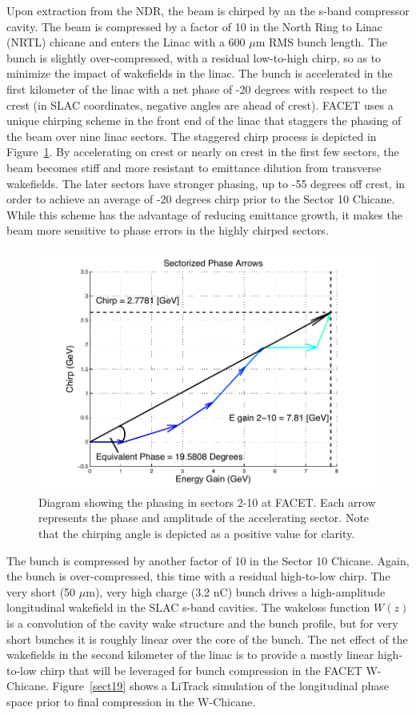\documentclass[%
twocolumn,
showpacs,preprintnumbers,
 aps,
prstab,
]{revtex4-1}
\begin{document}
Upon extraction from the NDR, the beam is chirped by an the s-band compressor cavity. The beam is compressed by a factor of 10 in the North Ring to Linac (NRTL) chicane and enters the Linac with a 600 $\mu$m RMS bunch length. The bunch is slightly over-compressed, with a residual low-to-high chirp, so as to minimize the impact of wakefields in the linac. The bunch is accelerated in the first kilometer of the linac with a net phase of -20 degrees with respect to the crest (in SLAC coordinates, negative angles are ahead of crest). FACET uses a unique chirping scheme in the front end of the linac that staggers the phasing of the beam over nine linac sectors. The staggered chirp process is depicted in Figure~\ref{stag}. By accelerating on crest or nearly on crest in the first few sectors, the beam becomes stiff and more resistant to emittance dilution from transverse wakefields. The later sectors have stronger phasing, up to -55 degrees off crest, in order to achieve an average of -20 degrees chirp prior to the Sector 10 Chicane. While this scheme has the advantage of reducing emittance growth, it makes the beam more sensitive to phase errors in the highly chirped sectors.

\begin{figure}[hb]
  \includegraphics[width=\columnwidth]{figures/stag.pdf}
  \caption{Diagram showing the phasing in sectors 2-10 at FACET. Each arrow represents the phase and amplitude of the accelerating sector. Note that the chirping angle is depicted as a positive value for clarity.}
  \label{stag}
\end{figure}

The bunch is compressed by another factor of 10 in the Sector 10 Chicane. Again, the bunch is over-compressed, this time with a residual high-to-low chirp. The very short (50 $\mu$m), very high charge (3.2 nC) bunch drives a high-amplitude longitudinal wakefield in the SLAC s-band cavities. The wakeloss function $W(z)$ is a convolution of the cavity wake structure and the bunch profile, but for very short bunches it is roughly linear over the core of the bunch. The net effect of the wakefields in the second kilometer of the linac is to provide a mostly linear high-to-low chirp that will be leveraged for bunch compression in the FACET W-Chicane. Figure~\ref{sect19} shows a LiTrack simulation of the longitudinal phase space prior to final compression in the W-Chicane.
\end{document}

